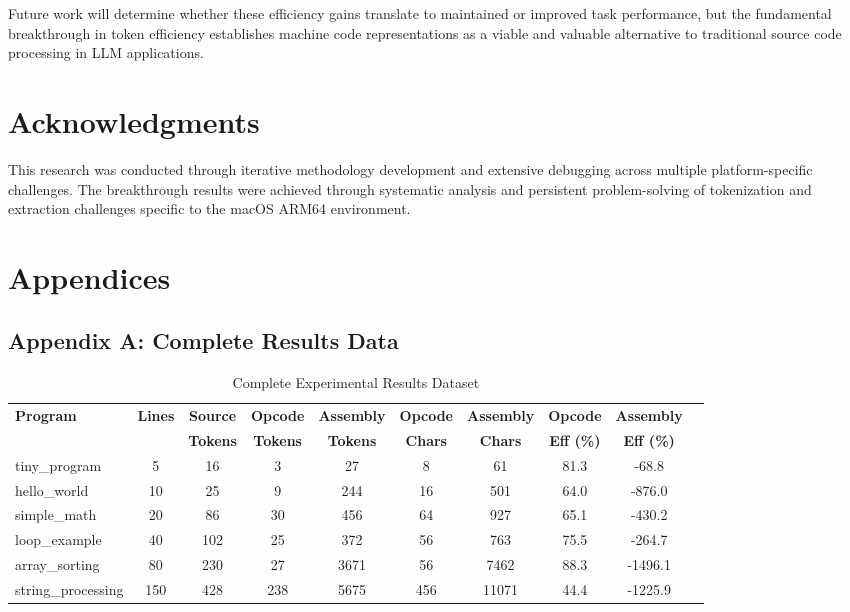 \documentclass[11pt,a4paper]{article}
\begin{document}
Future work will determine whether these efficiency gains translate to maintained or improved task performance, but the fundamental breakthrough in token efficiency establishes machine code representations as a viable and valuable alternative to traditional source code processing in LLM applications.

\section{Acknowledgments}
This research was conducted through iterative methodology development and extensive debugging across multiple platform-specific challenges. The breakthrough results were achieved through systematic analysis and persistent problem-solving of tokenization and extraction challenges specific to the macOS ARM64 environment.

\section{Appendices}

\subsection{Appendix A: Complete Results Data}
\begin{table}[H]
\centering
\caption{Complete Experimental Results Dataset}
\footnotesize
\begin{tabular}{lccccccccc}
\toprule
\textbf{Program} & \textbf{Lines} & \textbf{Source} & \textbf{Opcode} & \textbf{Assembly} & \textbf{Opcode} & \textbf{Assembly} & \textbf{Opcode} & \textbf{Assembly}\\
& & \textbf{Tokens} & \textbf{Tokens} & \textbf{Tokens} & \textbf{Chars} & \textbf{Chars} & \textbf{Eff (\%)} & \textbf{Eff (\%)}\\
\midrule
tiny\_program & 5 & 16 & 3 & 27 & 8 & 61 & 81.3 & -68.8\\
hello\_world & 10 & 25 & 9 & 244 & 16 & 501 & 64.0 & -876.0\\
simple\_math & 20 & 86 & 30 & 456 & 64 & 927 & 65.1 & -430.2\\
loop\_example & 40 & 102 & 25 & 372 & 56 & 763 & 75.5 & -264.7\\
array\_sorting & 80 & 230 & 27 & 3671 & 56 & 7462 & 88.3 & -1496.1\\
string\_processing & 150 & 428 & 238 & 5675 & 456 & 11071 & 44.4 & -1225.9\\
\bottomrule
\end{tabular}
\end{table}
\end{document}
